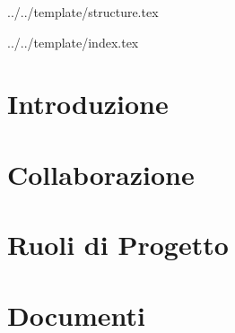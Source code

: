 


\def\DOCUMENTO{Norme di Progetto}
\def\VERSIONE{1.0.0}

\def\DESCRIZIONE{Documento contenente l’insieme di norme stabilite dal gruppo \GRUPPO per la realizzazione del progetto didattico \PROGETTO.}

\def\REDATTORE {Suierica Bogdan \\ & Crespan Emanuele}
\def\VERIFICATORE {Agostinetto Matteo}
\def\RESPONSABILE {Burlin Valerio}

\def\USO {Interno}

\def\DISTRIBUZIONE {\GRUPPO{}\\ & \COMMITTENTE{}\\}

\def\DESCRIZIONE {Documento contenente l'insieme di norme stabilite dal gruppo \GRUPPO\ per la realizzazione di \PROGETTO.}


\def\INDICE	{true}
\def\TABELLE {false}
\def\FIGURE {true}


 {../../template/structure.tex}



 {../../template/index.tex}


\section{Introduzione}

\newpage
\section{Collaborazione}

\newpage
\section{Ruoli di Progetto}

\newpage
\section{Documenti}

\newpage
